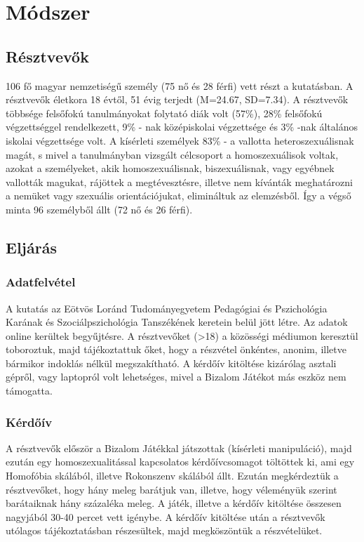 \section{Módszer}
\subsection{Résztvevők}
106 fő magyar nemzetiségű személy (75 nő és 28 férfi) vett részt a kutatásban. A résztvevők életkora 18 évtől, 51 évig terjedt (M=24.67, SD=7.34). A résztvevők többsége felsőfokú tanulmányokat folytató diák volt (57\%), 28\% felsőfokú végzettséggel rendelkezett, 9\% - nak középiskolai végzettsége és 3\% -nak általános iskolai végzettsége volt. A kísérleti személyek 83\% - a vallotta heteroszexuálisnak magát, s mivel a tanulmányban vizsgált célcsoport a homoszexuálisok voltak, azokat a személyeket, akik homoszexuálisnak, biszexuálisnak, vagy egyébnek vallották magukat, rájöttek a megtévesztésre, illetve nem kívánták meghatározni a nemüket vagy szexuális orientációjukat, elimináltuk az elemzésből. Így a végső minta 96 személyből állt (72 nő és 26 férfi). 
\subsection{Eljárás}
\subsubsection{Adatfelvétel}
A kutatás az Eötvös Loránd Tudományegyetem Pedagógiai és Pszichológia Karának és Szociálpszichológia Tanszékének keretein belül jött létre. Az adatok online kerültek begyűjtésre. A résztvevőket (\textgreater 18) a közösségi médiumon keresztül toboroztuk, majd tájékoztattuk őket, hogy a részvétel önkéntes, anonim, illetve bármikor  indoklás nélkül megszakítható. A kérdőív kitöltése kizárólag asztali gépről, vagy laptopról volt lehetséges, mivel a Bizalom Játékot \parencite{szekeres_halperin_kende_saguy} más eszköz nem támogatta. 
\subsubsection{Kérdőív}
A résztvevők először a Bizalom Játékkal játszottak (kísérleti manipuláció), majd ezután egy homoszexualitással kapcsolatos kérdőívcsomagot töltöttek ki, ami egy Homofóbia skálából, illetve Rokonszenv skálából állt. Ezután megkérdeztük a résztvevőket, hogy hány meleg barátjuk van, illetve, hogy véleményük szerint barátaiknak hány százaléka meleg. A játék, illetve a kérdőív kitöltése összesen nagyjából 30-40 percet vett igénybe. A kérdőív kitöltése után a résztvevők utólagos tájékoztatásban részesültek, majd megköszön\-tük a részvételüket. 

